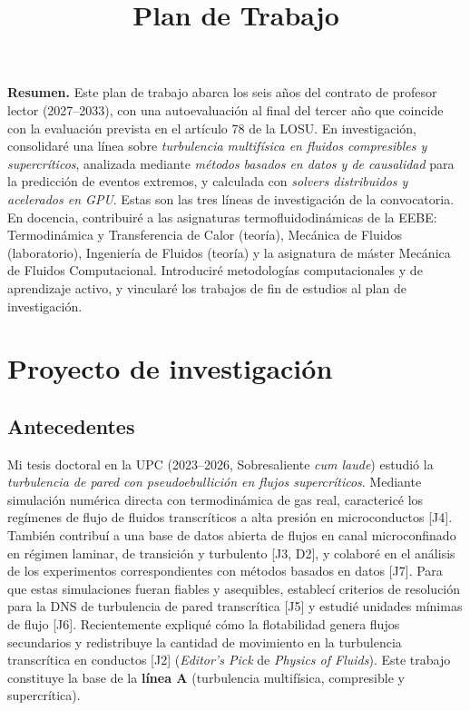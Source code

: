 \documentclass[11pt]{article}
\title{\textbf{Plan de Trabajo}}
\author{\Large \CandName}
\date{}
\begin{document}
\maketitle
\thispagestyle{plain}
\vspace{0.5cm}
\begin{center}\postdata\end{center}

\vspace{0.8cm}
\noindent\textbf{Resumen.}
Este plan de trabajo abarca los seis años del contrato de profesor lector (2027--2033),
con una autoevaluación al final del tercer año que coincide con la evaluación prevista en
el artículo 78 de la LOSU. En investigación, consolidaré una línea sobre \emph{turbulencia
multifísica en fluidos compresibles y supercríticos}, analizada mediante \emph{métodos
basados en datos y de causalidad} para la predicción de eventos extremos, y calculada con
\emph{solvers distribuidos y acelerados en GPU}. Estas son las tres líneas de investigación
de la convocatoria. En docencia, contribuiré a las asignaturas termofluidodinámicas de la
EEBE: Termodinámica y Transferencia de Calor (teoría), Mecánica de Fluidos (laboratorio),
Ingeniería de Fluidos (teoría) y la asignatura de máster Mecánica de Fluidos Computacional.
Introduciré metodologías computacionales y de aprendizaje activo, y vincularé los trabajos
de fin de estudios al plan de investigación.

\newpage
\tableofcontents
\newpage

\section{Proyecto de investigación}

\subsection{Antecedentes}
Mi tesis doctoral en la UPC (2023--2026, Sobresaliente \emph{cum laude}) estudió la
\emph{turbulencia de pared con pseudoebullición en flujos supercríticos}. Mediante
simulación numérica directa con termodinámica de gas real, caractericé los regímenes de
flujo de fluidos transcríticos a alta presión en microconductos [J4]. También contribuí a una
base de datos abierta de flujos en canal microconfinado en régimen laminar, de transición y
turbulento [J3, D2], y colaboré en el análisis de los experimentos correspondientes con
métodos basados en datos [J7]. Para que estas simulaciones fueran fiables y asequibles,
establecí criterios de resolución para la DNS de turbulencia de pared transcrítica [J5] y
estudié unidades mínimas de flujo [J6]. Recientemente expliqué cómo la flotabilidad genera
flujos secundarios y redistribuye la cantidad de movimiento en la turbulencia transcrítica
en conductos [J2] (\emph{Editor's Pick} de \emph{Physics of Fluids}). Este trabajo constituye
la base de la \textbf{línea A} (turbulencia multifísica, compresible y supercrítica).
\end{document}
